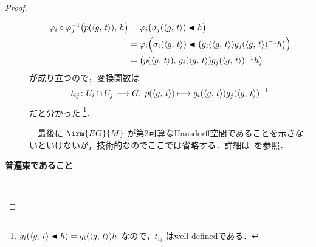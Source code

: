 \documentclass[TQFT_main]{subfiles}
\begin{document}
\begin{proof}
\begin{description}
\begin{align}
            \varphi_i \circ \varphi_j^{-1}\bigl(p(\expval{g,\, t}),\, h\bigr) 
            &= \varphi_i \bigl( \sigma_j(\expval{g,\, t}) \blacktriangleleft h \bigr) \\
            &= \varphi_i \Bigl( \sigma_i(\expval{g,\, t}) \blacktriangleleft \bigl(g_i(\expval{g,\, t}) g_j(\expval{g,\, t})^{-1} h\bigr)  \Bigr) \\
            &= \bigl( p(\expval{g,\, t}),\, g_i(\expval{g,\, t}) g_j(\expval{g,\, t})^{-1} h \bigr) 
        \end{align}
        が成り立つので，変換関数は
        \begin{align}
            t_{ij} \colon U_i \cap U_j \longrightarrow G,\; p(\expval{g,\, t}) \longmapsto  g_i(\expval{g,\, t}) g_j(\expval{g,\, t})^{-1}
        \end{align}
        だと分かった
        \footnote{
            $g_i(\expval{g,\, t} \blacktriangleleft h) = g_i(\expval{g,\, t})h$ なので，$t_{ij}$ はwell-definedである．
        }．
        
        　最後に $\irm{EG}{M}$ が第2可算なHausdorff空間であることを示さないといけないが，技術的なのでここでは省略する．詳細は~\cite[p.55, 11.2 Theorem]{Husemoller1994}を参照．

        \item[\textbf{普遍束であること}]　
        

\end{description}
\end{proof}
\end{document}
